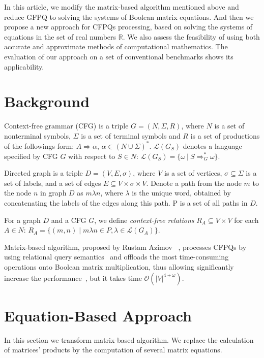 \documentclass[sigconf]{acmart}
\begin{document}
In this article, we modify the matrix-based algorithm mentioned above and reduce GFPQ to solving the systems of Boolean matrix equations.
And then we propose a new approach for CFPQs processing, based on solving the systems of equations in the set of real numbers $\mathbb{R}$.
We also assess the feasibility of using both accurate and approximate methods of computational mathematics.
The evaluation of our approach on a set of conventional benchmarks shows its applicability.

\section{Background}

Context-free grammar (CFG) is a triple $G=(N, \Sigma, R)$, where $N$ is a set of nonterminal symbols, $\Sigma$ is a set of terminal symbols and $R$ is a set of productions of the followings form: $A \Rightarrow \alpha$, $\alpha \in (N \cup \Sigma)^*$. 
$\mathcal{L}(G_S)$ denotes a language specified by CFG $G$ with respect to $S \in N$: $\mathcal{L}(G_S) = \{\omega~|~S \Rightarrow_{G}^{*} \omega\}$.

Directed graph is a triple $D = (V,E,\sigma)$, where $V$ is a set of vertices, $\sigma \subseteq \Sigma$ is a set of labels, and a set of edges $E\subseteq V\times \sigma \times V$. 
Denote a path from the node $m$ to the node $n$ in graph $D$ as $m\lambda n$, where
$\lambda$ is the unique word, obtained by concatenating the labels of the edges along this path.
P is a set of all paths in $D$.

For a graph $D$ and a CFG $G$, we define \emph{context-free relations} \mbox{$R_A \subseteq V \times V$} for each \mbox{$A \in N$}: $R_A = \{(m, n) \mid m\lambda n \in P, \lambda \in \mathcal{L}(G_A)\}.$

Matrix-based algorithm, proposed by Rustam Azimov ~\cite{azimov2018context}, processes CFPQs by using relational query semantics~\cite{hellings2015querying} and offloads the most time-consuming operations onto Boolean matrix multiplication, thus allowing significantly increase the performance~\cite{mishin2019evaluation}, but it takes time $\mathcal{O}(|V|^{4+\omega})$. 


\section{Equation-Based Approach}

In this section we transform matrix-based algorithm. 
We replace the calculation of matrices' products by the computation of several matrix equations.
\end{document}
